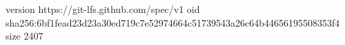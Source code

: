version https://git-lfs.github.com/spec/v1
oid sha256:6bf1fead23d23a30ed719c7e52974664c51739543a26c64b44656195508353f4
size 2407
